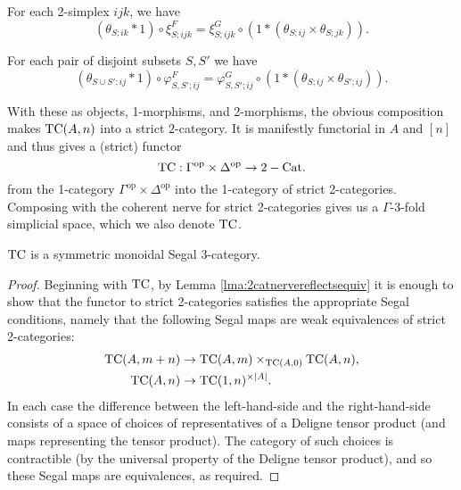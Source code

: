 \documentclass[a4paper]{amsart}
\begin{document}
\begin{list}{(TC2M)}{}
	\item For each 2-simplex $ijk$, we have
	\begin{equation*}
		(\theta_{S; ik} * 1) \circ \xi^F_{S; ijk} = \xi^G_{S;ijk} \circ (1 * (\theta_{S; ij} \times \theta_{S; jk})).
	\end{equation*}
	\item For each pair of disjoint subsets $S, S'$ we have
	\begin{equation*}
		(\theta_{S \cup S'; ij} * 1) \circ \varphi^F_{S, S'; ij} = \varphi^G_{S,S';ij} \circ (1*(\theta_{S;ij} \times \theta_{S';ij})).
	\end{equation*}
\end{list}
With these as objects, 1-morphisms, and 2-morphisms, the obvious composition makes $\mathrm{TC}(A,n)$ into a strict $2$-category.  
It is manifestly functorial in $A$ and $[n]$ and thus gives a (strict) functor 
\begin{equation*}
	\mathrm{TC}: \Gamma^\textrm{op} \times \Delta^\textrm{op} \to 2-\mathrm{Cat}.
\end{equation*}
from the 1-category $\Gamma^\textrm{op} \times \Delta^\textrm{op}$ into the 1-category of strict 2-categories. Composing with the coherent nerve for strict 2-categories gives us a $\Gamma$-3-fold simplicial space, which we also denote $\mathrm{TC}$. 

\begin{theorem}
	 $\mathrm{TC}$ is a symmetric monoidal Segal 3-category.  
\end{theorem}
\begin{proof}
	Beginning with $\mathrm{TC}$,
	by Lemma \ref{lma:2catnervereflectsequiv} it is enough to show that the functor to strict 2-categories satisfies the appropriate Segal conditions, namely that the following Segal maps are weak equivalences of strict 2-categories: 
	\begin{align*}
		\mathrm{TC}(A, m + n) & \to \mathrm{TC}(A, m) \times_{\mathrm{TC}(A, 0)} \mathrm{TC}(A, n), \\
		\mathrm{TC}(A, n) & \to \mathrm{TC}(1, n)^{\times |A|}. 
	\end{align*}
In each case the difference between the left-hand-side and the right-hand-side consists of a space of choices of representatives of a Deligne tensor product (and maps representing the tensor product). The category of such choices is contractible (by the universal property of the Deligne tensor product), and so these Segal maps are equivalences, as required. 
\end{proof}
\end{document}
